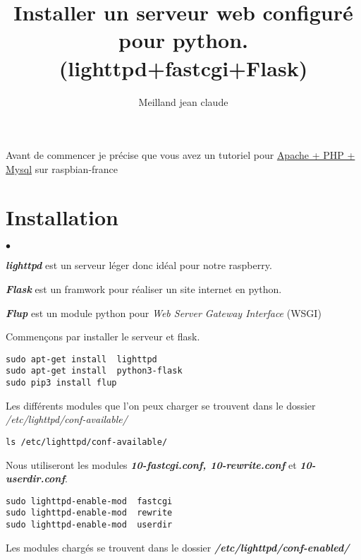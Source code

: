 \documentclass[a4paper,10pt,usenames]{article}
\title{Installer un serveur web  configuré pour python. (lighttpd+fastcgi+Flask)}
\author{Meilland jean claude}
\begin{document}
\maketitle


Avant de commencer je précise que vous avez un tutoriel  pour \href{https://raspbian-france.fr/installer-serveur-web-raspberry-lamp/}{Apache + PHP + Mysql} sur raspbian-france



\section{Installation}

\begin{list}{$\bullet$}{}
\item \textit{\textbf{lighttpd}} est un serveur léger donc idéal pour notre raspberry.
\item \textit{\textbf{Flask}} est un framwork  pour réaliser un site internet en python.
\item \textit{\textbf{Flup}} est un module python pour  \textit{Web Server Gateway Interface} (WSGI)
\end{list}

Commençons par installer le serveur et flask.

\begin{lstlisting}
sudo apt-get install  lighttpd
sudo apt-get install  python3-flask
sudo pip3 install flup
\end{lstlisting}

Les différents modules que l'on peux charger se trouvent dans le dossier \textit{/etc/lighttpd/conf-available/}

\begin{lstlisting}
ls /etc/lighttpd/conf-available/
\end{lstlisting}

Nous utiliseront les modules \textit{\textbf{10-fastcgi.conf,  10-rewrite.conf}} et \textbf{\textit{10-userdir.conf}}.

\begin{lstlisting}
sudo lighttpd-enable-mod  fastcgi
sudo lighttpd-enable-mod  rewrite
sudo lighttpd-enable-mod  userdir
\end{lstlisting}

Les modules chargés se trouvent dans le dossier  \textit{\textbf{/etc/lighttpd/conf-enabled/}}
\end{document}
